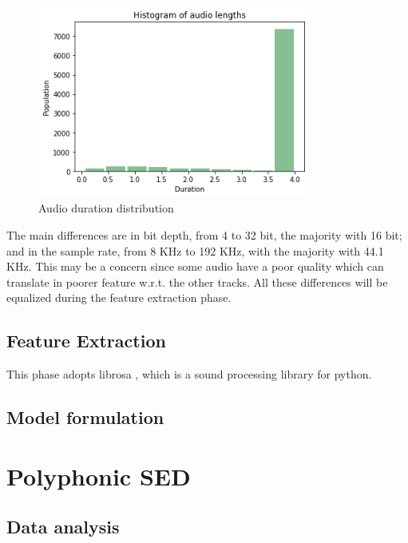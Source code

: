 \documentclass{article}
\begin{document}
\begin{figure}[H]
	\centering
	\includegraphics[width=0.8\textwidth]{./images/mono/duration.png}	
	\caption{Audio duration distribution}
	\label{fig:mono_duration}
\end{figure}

The main differences are in bit depth, from 4 to 32 bit, the majority with 16 bit; and in the sample rate, from 8 KHz to 192 KHz, with the majority with 44.1 KHz. This may be a concern since some audio have a poor quality which can translate in poorer feature w.r.t. the other tracks. All these differences will be equalized during the feature extraction phase.

\subsection{Feature Extraction}
\label{subsec:mono_feature}

This phase adopts librosa \cite{mcfee2015librosa}, which is a sound processing library for python.

\subsection{Model formulation}
\label{subsec:mono_model}


\section{Polyphonic SED}
\label{sec:poly}

\subsection{Data analysis}
\label{subsec:poly_analysis}
\end{document}
